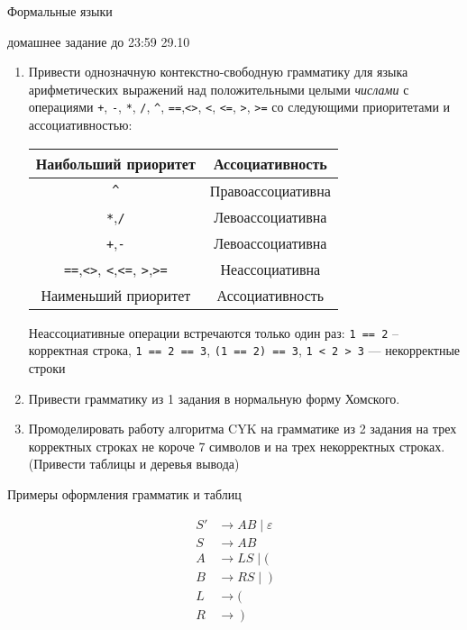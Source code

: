 \documentclass[12pt]{article}
\begin{document}
\begin{center} {\LARGE Формальные языки} \end{center}

\begin{center} \Large домашнее задание до 23:59 29.10 \end{center}
\bigskip

\begin{enumerate}
  \item
  {
    Привести однозначную контекстно-свободную грамматику для языка арифметических выражений над положительными целыми \emph{числами} с операциями \verb!+!, \verb!-!, \verb!*!, \verb!/!, \verb!^!, \verb!==!,\verb!<>!, \verb!<!, \verb!<=!, \verb!>!, \verb!>=! со следующими приоритетами и ассоциативностью:

  \begin{center}
    \begin{tabular}{ c | c }
      Наибольший приоритет & Ассоциативность  \\ \hline \hline
      \verb!^! & Правоассоциативна \\
     \verb!*!,\verb!/! & Левоассоциативна \\
     \verb!+!,\verb!-! & Левоассоциативна \\
     \verb!==!,\verb!<>!, \verb!<!,\verb!<=!, \verb!>!,\verb!>=! & Неассоциативна \\ \hline \hline
     Наименьший приоритет & Ассоциативность
    \end{tabular}
    \end{center}


    Неассоциативные операции встречаются только один раз: \verb!1 == 2! -- корректная строка, \verb!1 == 2 == 3!, \verb!(1 == 2) == 3!, \verb!1 < 2 > 3! --- некорректные строки
  }
  \item Привести грамматику из 1 задания в нормальную форму Хомского.
  \item Промоделировать работу алгоритма CYK на грамматике из 2 задания на трех корректных строках не короче 7 символов и на трех некорректных строках. (Привести таблицы и деревья вывода)
\end{enumerate}

\bigskip

\begin{center}
  \Large{Примеры оформления грамматик и таблиц}
\end{center}

\begin{center}
  \begin{align*}
    S' &\to A B \mid \varepsilon \\
    S  &\to A B \\
    A  &\to L S \mid ( \\
    B  &\to R S \mid \ ) \\
    L  &\to ( \\
    R  &\to \ )
  \end{align*}
\end{center}
\end{document}
